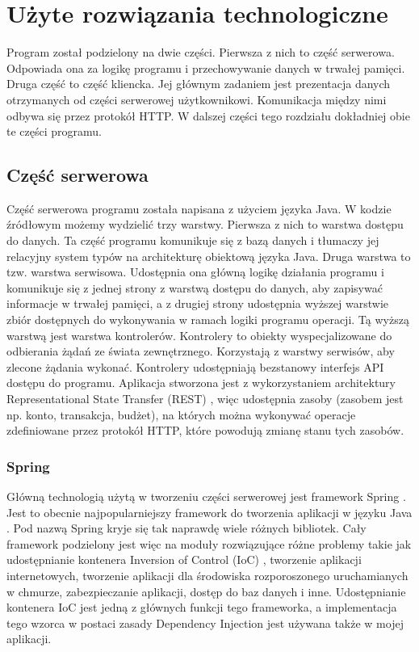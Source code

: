 \documentclass[shortabstract,inz]{iithesis}
\begin{document}
\chapter{Użyte rozwiązania technologiczne}
Program został podzielony na dwie części. Pierwsza z nich to część serwerowa. Odpowiada ona za logikę programu i przechowywanie danych w trwałej pamięci. Druga część to część kliencka. Jej głównym zadaniem jest prezentacja danych otrzymanych od części serwerowej użytkownikowi. Komunikacja między nimi odbywa się przez protokół HTTP. W dalszej części tego rozdziału dokładniej obie te części programu.
\section{Część serwerowa}
Część serwerowa programu została napisana z użyciem języka Java. W kodzie źródłowym możemy wydzielić trzy warstwy. Pierwsza z nich to warstwa dostępu do danych. Ta część programu komunikuje się z bazą danych i tłumaczy jej relacyjny system typów na architekturę obiektową języka Java. Druga warstwa to tzw. warstwa serwisowa. Udostępnia ona główną logikę działania programu i komunikuje się z jednej strony z warstwą dostępu do danych, aby zapisywać informacje w trwałej pamięci, a z drugiej strony udostępnia wyższej warstwie zbiór dostępnych do wykonywania w ramach logiki programu operacji. Tą wyższą warstwą jest warstwa kontrolerów. Kontrolery to obiekty wyspecjalizowane do odbierania żądań ze świata zewnętrznego. Korzystają z warstwy serwisów, aby zlecone żądania wykonać.
Kontrolery udostępniają bezstanowy interfejs API dostępu do programu. Aplikacja stworzona jest z wykorzystaniem architektury Representational State Transfer (REST) \cite{rest} , więc udostępnia zasoby (zasobem jest np. konto, transakcja, budżet), na których można wykonywać operacje zdefiniowane przez protokół HTTP, które powodują zmianę stanu tych zasobów.
\subsection{Spring}
Główną technologią użytą w tworzeniu części serwerowej jest framework Spring \cite{spring}. Jest to obecnie najpopularniejszy framework do tworzenia aplikacji w języku Java \cite{spring-popularity}. Pod nazwą Spring kryje się tak naprawdę wiele różnych bibliotek. Cały framework podzielony jest więc na moduły rozwiązujące różne problemy \cite{spring-modules} takie jak udostępnianie kontenera Inversion of Control (IoC) \citep{ioc}, tworzenie aplikacji internetowych, tworzenie aplikacji dla środowiska rozporoszonego uruchamianych w chmurze, zabezpieczanie aplikacji, dostęp do baz danych i inne. Udostępnianie kontenera IoC jest jedną z głównych funkcji tego frameworka, a implementacja tego wzorca w postaci zasady Dependency Injection jest używana także w mojej aplikacji.
\end{document}
